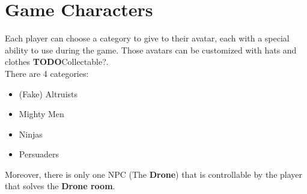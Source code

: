 \section{Game Characters}

Each player can choose a category to give to their avatar, each with a special ability to use during the game. Those avatars can be customized with hats and clothes \textbf{TODO}Collectable?.\\
There are 4 categories:\\
\begin{itemize}
	\item (Fake) Altruists
	\item Mighty Men
	\item Ninjas
	\item Persuaders
\end{itemize}
Moreover, there is only one NPC (The \textbf{Drone}) that is controllable by the player that solves the \textbf{Drone room}.


\clearpage




\clearpage





\pagebreak 